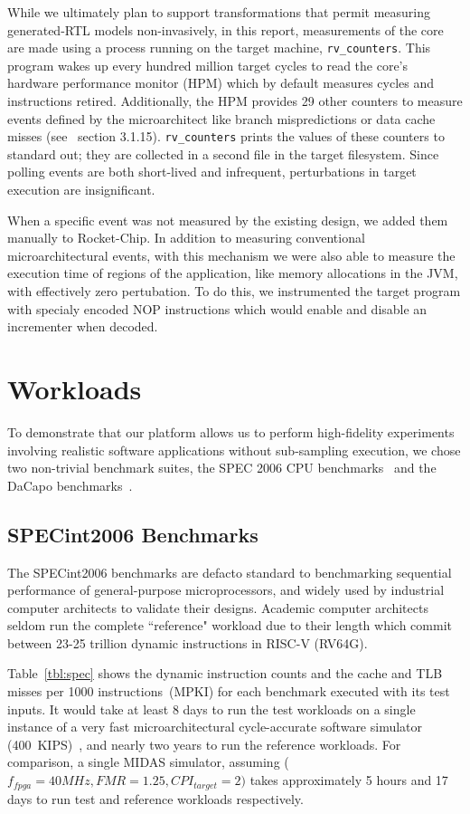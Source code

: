While we ultimately plan to support transformations that permit
measuring generated-RTL models non-invasively, in this report,
measurements of the core are made using a process running on the target machine,
\texttt{rv\_counters}. This program wakes up every hundred million target
cycles to read the core's hardware performance monitor (HPM) which by default measures
cycles and instructions retired. Additionally, the HPM provides 29 other counters to measure
events defined by the microarchitect like branch mispredictions or data
cache misses (see~\cite{Waterman:EECS-2016-161} section 3.1.15).
\texttt{rv\_counters} prints the values of these counters to standard out; they are collected
in a second file in the target filesystem. Since polling events are both
short-lived and infrequent, perturbations in target execution are insignificant.

When a specific event was not measured by the existing design, we added them
manually to Rocket-Chip. In addition to measuring conventional
microarchitectural events, with this mechanism we were also able to measure the
execution time of regions of the application, like memory allocations in the
JVM, with effectively zero pertubation. To do this, we instrumented the target
program with specialy encoded NOP instructions which would enable and disable
an incrementer when decoded.

\section{Workloads}

To demonstrate that our platform allows us to perform high-fidelity experiments
involving realistic software applications without sub-sampling execution, we
chose two non-trivial benchmark suites, the SPEC 2006 CPU
benchmarks~\cite{spec_cpu_2006} and the DaCapo benchmarks~\cite{dacapo}.

\subsection{SPECint2006 Benchmarks} The SPECint2006 benchmarks are defacto
standard to benchmarking sequential performance of general-purpose
microprocessors, and widely used by industrial computer architects to validate
their designs. Academic computer architects seldom run the complete
``reference" workload due to their length which commit between 23-25 trillion
dynamic instructions in RISC-V (RV64G).

Table~\ref{tbl:spec} shows the dynamic instruction counts and the cache and TLB
misses per 1000 instructions~(MPKI) for each benchmark executed with its test
inputs. It would take at least 8 days to run the test workloads on a single
instance of a very fast microarchitectural cycle-accurate software simulator
(400~KIPS)~\cite{marssx86}, and nearly two years to run the reference
workloads. For comparison, a single MIDAS simulator, assuming ($f_{fpga} = 40
MHz, FMR = 1.25, CPI_{target} = 2)$ takes approximately 5 hours and 17 days to
run test and reference workloads respectively.

